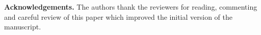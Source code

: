 \documentclass[12pt,a4paper,oneside]{article}
\def \newsection{\vspace{12pt}\textbf}
\begin{document}
\vspace{12pt}

{\bf Acknowledgements.} The authors thank the reviewers for reading, commenting and careful review of this paper which improved the initial version of the manuscript. 

%
%
%


\end{document}

